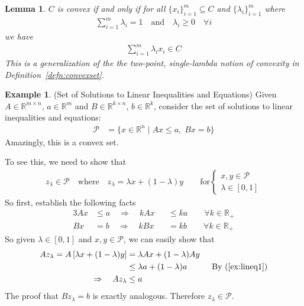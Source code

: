 \documentclass[12pt]{article}
\numberwithin{equation}{section} %
\theoremstyle{plain}
\newtheorem{lem}[thm]{Lemma}
\theoremstyle{definition}
\newtheorem{ex}[thm]{Example}
\theoremstyle{remark}
\newcommand{\R}{\mathbb{R}}
\newcommand{\Rn}{\mathbb{R}^n}
\begin{document}
\begin{lem}
$C$ is convex if and only if
for all $\{x_i\}_{i=1}^m \subseteq C$ and $\{\lambda_i\}_{i=1}^m$ where
\begin{align*}
  \sum^{m}_{i=1} \lambda_i = 1
  \quad \text{and} \quad \lambda_i \geq 0 \quad \forall i
\end{align*}
we have
\begin{align*}
  \sum^m_{i=1} \lambda_i x_i \in C
\end{align*}
This is a generalization of the the two-point, single-lambda notion of
convexity in Definition~\ref{defn:convexset}.
\end{lem}

\begin{ex}{(Set of Solutions to Linear Inequalities and Equations)}
Given $A \in \R^{m\times n}$, $a\in \R^m$ and $B \in \R^{k \times n}$,
$b\in \R^k$, consider the set of solutions to linear inequalities and
equations:
\begin{align*}
  \mathscr{P}
  &= \{
  x\in \Rn \; | \; Ax \leq a, \; Bx = b
  \}
\end{align*}
Amazingly, this is a convex set.

To see this, we need to show that
\begin{align*}
  z_\lambda \in \mathscr{P}
  \quad \text{where} \quad
  z_\lambda = \lambda x + (1-\lambda)y
  \qquad
  \text{for}
  \begin{cases}
  x,y\in \mathscr{P}\\
  \lambda \in [0,1]
  \end{cases}
\end{align*}
So first, establish the following facts
\begin{alignat}{3}
  Ax &\leq a \quad \Rightarrow \quad
  k Ax &&\leq k a
  \qquad \forall k \in \R_+ \label{ex:lineq1}\\
  Bx &= b \quad \Rightarrow \quad
  k Bx &&= k b
  \qquad \forall k \in \R_+
  \label{ex:lineq2}
\end{alignat}
So given $\lambda \in [0,1]$ and $x,y\in \mathscr{P}$, we can easily
show that
\begin{align*}
  Az_\lambda
  = A\left[\lambda x + (1-\lambda) y\right]
  &= \lambda Ax + (1-\lambda) Ay \\
  &\leq \lambda a + (1-\lambda) a
  \quad\qquad \text{By~(\ref{ex:lineq1})} \\
  \Rightarrow \quad
  Az_\lambda
  &\leq a
\end{align*}
The proof that $Bz_\lambda = b$ is exactly analogous. Therefore
$z_\lambda\in \mathscr{P}$.
\end{ex}
\end{document}
